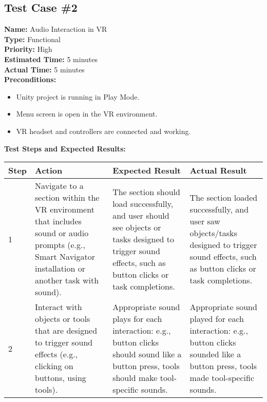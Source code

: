 \documentclass[11pt]{article}
\begin{document}
\subsection{Test Case \#2}
\textbf{Name:} Audio Interaction in VR \\
\textbf{Type:} Functional \\
\textbf{Priority:} High \\
\textbf{Estimated Time:} 5 minutes \\
\textbf{Actual Time:} 5 minutes \\
\textbf{Preconditions:} 
\begin{itemize}
    \item Unity project is running in Play Mode.
    \item Menu screen is open in the VR environment.
    \item VR headset and controllers are connected and working.
\end{itemize}
\textbf{Test Steps and Expected Results:} \\
\begin{tabular}{@{} p{0.8cm} p{4.6cm} p{4.6cm} p{4.6cm} @{}}
\toprule
\textbf{Step} & \textbf{Action} & \textbf{Expected Result} & \textbf{Actual Result} \\
\midrule
1 & Navigate to a section within the VR environment that includes sound or audio prompts (e.g., Smart Navigator installation or another task with sound). & The section should load successfully, and user should see objects or tasks designed to trigger sound effects, such as button clicks or task completions. & The section loaded successfully, and user saw objects/tasks designed to trigger sound effects, such as button clicks or task completions. \\
2 & Interact with objects or tools that are designed to trigger sound effects (e.g., clicking on buttons, using tools). & Appropriate sound plays for each interaction: e.g., button clicks should sound like a button press, tools should make tool-specific sounds. & Appropriate sound played for each interaction: e.g., button clicks sounded like a button press, tools made tool-specific sounds. \\
\bottomrule
\end{tabular}
\end{document}
